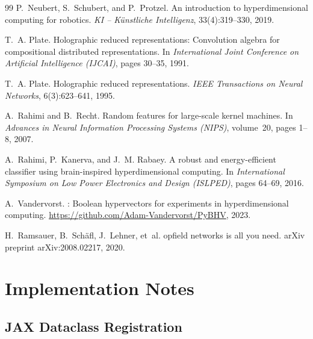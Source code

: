 \documentclass[twoside,11pt]{article}
\begin{document}
\begin{thebibliography}{99}
P.~Neubert, S.~Schubert, and P.~Protzel.
\newblock An introduction to hyperdimensional computing for robotics.
\newblock \textit{KI -- K{\"u}nstliche Intelligenz}, 33(4):319--330, 2019.

T.~A. Plate.
\newblock Holographic reduced representations: Convolution algebra for compositional distributed representations.
\newblock In \textit{International Joint Conference on Artificial Intelligence (IJCAI)}, pages 30--35, 1991.

T.~A. Plate.
\newblock Holographic reduced representations.
\newblock \textit{IEEE Transactions on Neural Networks}, 6(3):623--641, 1995.

A.~Rahimi and B.~Recht.
\newblock Random features for large-scale kernel machines.
\newblock In \textit{Advances in Neural Information Processing Systems (NIPS)}, volume~20, pages 1--8, 2007.

A.~Rahimi, P.~Kanerva, and J.~M. Rabaey.
\newblock A robust and energy-efficient classifier using brain-inspired hyperdimensional computing.
\newblock In \textit{International Symposium on Low Power Electronics and Design (ISLPED)}, pages 64--69, 2016.

A.~Vandervorst.
: Boolean hypervectors for experiments in hyperdimensional computing.
\newblock \url{https://github.com/Adam-Vandervorst/PyBHV}, 2023.

H.~Ramsauer, B.~Sch{\"a}fl, J.~Lehner, et~al.
opfield networks is all you need.
\newblock arXiv preprint arXiv:2008.02217, 2020.

\end{thebibliography}

\appendix

\section{Implementation Notes}
\label{app:implementation}

\subsection{JAX Dataclass Registration}
\end{document}
